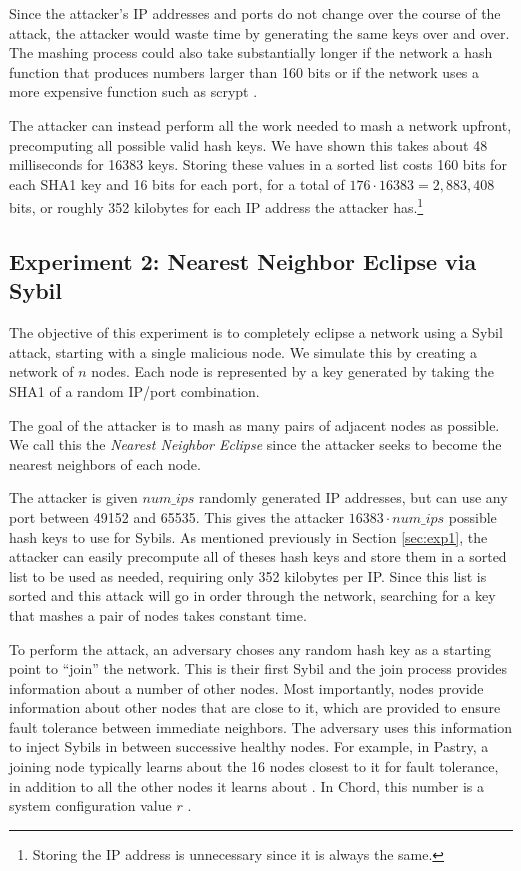 Since the attacker's IP addresses and ports do not change over the course of the attack, the attacker would waste time by generating the same keys over and over. 
The mashing process could also take substantially longer if the network a hash function that produces numbers larger than 160 bits or if the network uses a more expensive function such as scrypt \cite{scrypt}.

The attacker can instead perform all the work needed to mash a network upfront, precomputing all possible valid hash keys.
We have shown this takes about 48 milliseconds for 16383 keys.
Storing these values in a sorted list costs 160 bits for each SHA1 key and 16 bits for each port, for a total of $176  \cdot 16383 = 2,883,408$ bits, or roughly 352 kilobytes for each IP address the attacker has.\footnote{Storing the IP address is unnecessary since it is always the same.}




\subsection{Experiment 2:  Nearest Neighbor Eclipse via Sybil} %
\label{sec:exp2}
The objective of this experiment is to completely eclipse a network using a Sybil attack, starting with a single malicious node.
We simulate this by creating a network of $n$ nodes.
Each node is represented by a key generated by taking the SHA1 of a random IP/port combination.

The goal of the attacker is to mash as many pairs of adjacent nodes as possible.
We call this the \textit{Nearest Neighbor Eclipse} since the attacker seeks to become the nearest neighbors of each node.

The attacker is given $num\_ips$ randomly generated IP addresses, but can use any port between 49152 and 65535.
This gives the attacker $ 16383 \cdot num\_ips $ possible hash keys to use for Sybils.
As mentioned previously in Section \ref{sec:exp1}, the attacker can easily precompute all of theses hash keys and store them in a sorted list to be used as needed, requiring only 352 kilobytes per IP.
Since this list is sorted and this attack will go in order through the network, searching for a key that mashes a pair of nodes takes constant time.

To perform the attack, an adversary choses any random hash key as a starting point to ``join'' the network.
This is their first Sybil and the join process provides information about a number of other nodes.
Most importantly, nodes provide information about other nodes that are close to it, which are provided to ensure fault tolerance between immediate neighbors.
The adversary uses this information to inject Sybils in between successive healthy nodes.
For example, in Pastry, a joining node typically learns about the 16 nodes closest to it for fault tolerance, in addition to all the other nodes it learns about  \cite{pastry}.
In Chord, this number is a system configuration value $r$ \cite{chord}.

